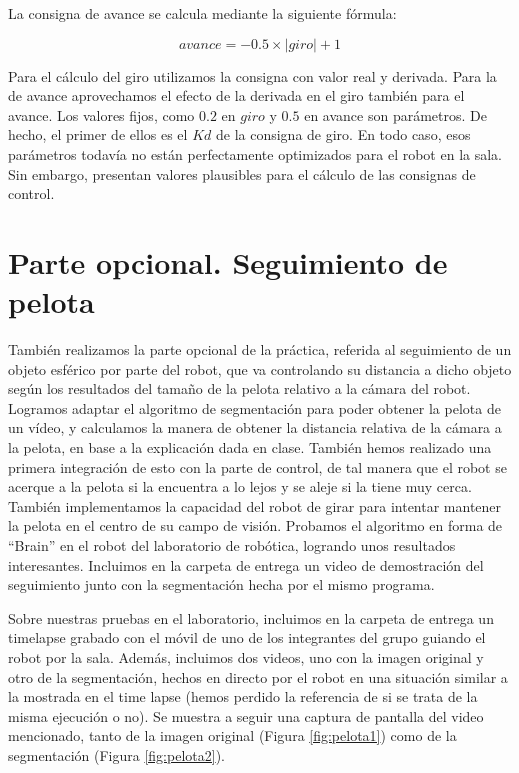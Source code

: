 \documentclass{article}
\begin{document}
        La consigna de avance se calcula mediante la siguiente fórmula:

        $$avance = -0.5 \times |giro| + 1$$

        Para el cálculo del giro utilizamos la consigna con valor real y derivada. Para la de avance aprovechamos el efecto de la derivada en el giro también para el avance. Los valores fijos, como $0.2$ en $giro$ y $0.5$ en avance son parámetros. De hecho, el primer de ellos es el $Kd$ de la consigna de giro. En todo caso, esos parámetros todavía no están perfectamente optimizados para el robot en la sala. Sin embargo, presentan valores plausibles para el cálculo de las consignas de control.

\section{Parte opcional. Seguimiento de pelota}
	También realizamos la parte opcional de la práctica, referida al seguimiento de un objeto esférico por parte del robot, que va controlando su distancia a dicho objeto según los resultados del tamaño de la pelota relativo a la cámara del robot. Logramos adaptar el algoritmo de segmentación para poder obtener la pelota de un vídeo, y calculamos la manera de obtener la distancia relativa de la cámara a la pelota, en base a la explicación dada en clase. También hemos realizado una primera integración de esto con la parte de control, de tal manera que el robot se acerque a la pelota si la encuentra a lo lejos y se aleje si la tiene muy cerca. También implementamos la capacidad del robot de girar para intentar mantener la pelota en el centro de su campo de visión. Probamos el algoritmo en forma de “Brain” en el robot del laboratorio de robótica, logrando unos resultados interesantes. Incluimos en la carpeta de entrega un video de demostración del seguimiento junto con la segmentación hecha por el mismo programa.

	Sobre nuestras pruebas en el laboratorio, incluimos en la carpeta de entrega un timelapse grabado con el móvil de uno de los integrantes del grupo guiando el robot por la sala. Además, incluimos dos videos, uno con la imagen original y otro de la segmentación, hechos en directo por el robot en una situación similar a la mostrada en el time lapse (hemos perdido la referencia de si se trata de la misma ejecución o no). Se muestra a seguir una captura de pantalla del video mencionado, tanto de la imagen original (Figura \ref{fig:pelota1}) como de la segmentación (Figura \ref{fig:pelota2}).
\end{document}
